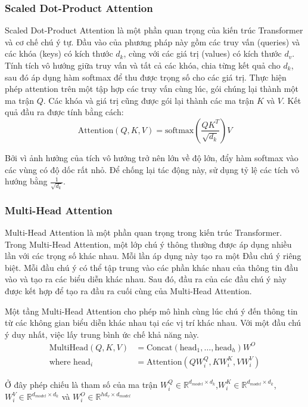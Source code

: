 \subsubsection*{Scaled Dot-Product Attention}
Scaled Dot-Product Attention là một phần quan trọng của kiến trúc Transformer và cơ chế chú ý tự. Đầu vào của phương pháp này gồm các truy vấn (queries) và các khóa (keys) có kích thước $d_k$, cùng với các giá trị (values) có kích thước $d_v$. Tính tích vô hướng giữa truy vấn và tất cả các khóa, chia từng kết quả cho $d_k$, sau đó áp dụng hàm softmax để thu được trọng số cho các giá trị. Thực hiện phép attention trên một tập hợp các truy vấn cùng lúc, gói chúng lại thành một ma trận $Q$. Các khóa và giá trị cũng được gói lại thành các ma trận $K$ và $V$. Kết quả đầu ra được tính bằng cách:
\[
    \text{Attention}(Q, K, V) = \text{softmax} (\frac{ QK^T }{ \sqrt{d_k} }) V   
\]

Bởi vì ảnh hưởng của tích vô hướng trở nên lớn về độ lớn, đẩy hàm softmax vào các vùng có độ dốc rất nhỏ.  Để chống lại tác động này, sử dụng tỷ lệ các tích vô hướng bằng \(\frac{1}{\sqrt{d_k}}\).

\subsubsection*{Multi-Head Attention}
Multi-Head Attention là một phần quan trọng trong kiến trúc Transformer. Trong Multi-Head Attention, một lớp chú ý thông thường được áp dụng nhiều lần với các trọng số khác nhau. Mỗi lần áp dụng này tạo ra một Đầu chú ý riêng biệt. Mỗi đầu chú ý có thể tập trung vào các phần khác nhau của thông tin đầu vào và tạo ra các biểu diễn khác nhau. Sau đó, đầu ra của các đầu chú ý này được kết hợp để tạo ra đầu ra cuối cùng của Multi-Head Attention.

Một tầng Multi-Head Attention cho phép mô hình cùng lúc chú ý đến thông tin từ các không gian biểu diễn khác nhau tại các vị trí khác nhau. Với một đầu chú ý duy nhất, việc lấy trung bình ức chế khả năng này\cite{vaswani2023attention}.
\begin{align*}
    \text{MultiHead}(Q, K, V) &= \text{Concat}(\text{head}_1, \ldots, \text{head}_h)W^O \\
    \text{where head}_i &= \text{Attention}(QW_i^Q, KW_i^K, VW_i^V)
\end{align*}

Ở đây phép chiếu là tham số của ma trận $W_i^Q \in \mathbb{R}^{d_{model} \times d_k}$,$ W_i^K \in \mathbb{R}^{d_{model} \times d_k}$, $W_i^V \in \mathbb{R}^{d_{model} \times d_k}$ và $W_i^O \in \mathbb{R}^{hd_v \times d_{model}}$

